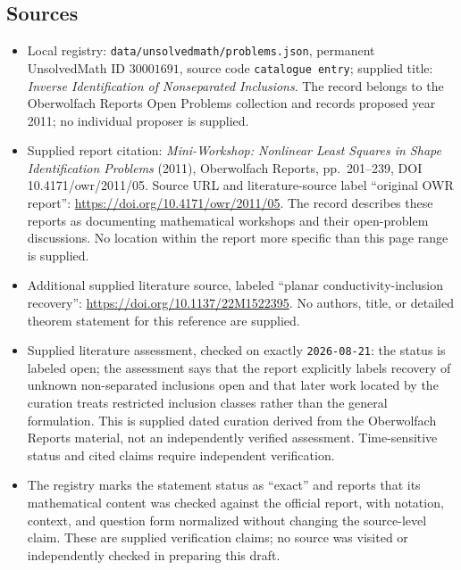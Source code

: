\documentclass[11pt]{article}
\begin{document}
\subsection{Sources}
\begin{itemize}
\item Local registry: \texttt{data/unsolvedmath/problems.json}, permanent UnsolvedMath ID \(30001691\), source code \texttt{catalogue entry}; supplied title: \emph{Inverse Identification of Nonseparated Inclusions}. The record belongs to the Oberwolfach Reports Open Problems collection and records proposed year 2011; no individual proposer is supplied.
\item Supplied report citation: \emph{Mini-Workshop: Nonlinear Least Squares in Shape Identification Problems} (2011), Oberwolfach Reports, pp.~201--239, DOI 10.4171/owr/2011/05. Source URL and literature-source label ``original OWR report'': \url{https://doi.org/10.4171/owr/2011/05}. The record describes these reports as documenting mathematical workshops and their open-problem discussions. No location within the report more specific than this page range is supplied.
\item Additional supplied literature source, labeled ``planar conductivity-inclusion recovery'': \url{https://doi.org/10.1137/22M1522395}. No authors, title, or detailed theorem statement for this reference are supplied.
\item Supplied literature assessment, checked on exactly \texttt{2026-08-21}: the status is labeled open; the assessment says that the report explicitly labels recovery of unknown non-separated inclusions open and that later work located by the curation treats restricted inclusion classes rather than the general formulation. This is supplied dated curation derived from the Oberwolfach Reports material, not an independently verified assessment. Time-sensitive status and cited claims require independent verification.
\item The registry marks the statement status as ``exact'' and reports that its mathematical content was checked against the official report, with notation, context, and question form normalized without changing the source-level claim. These are supplied verification claims; no source was visited or independently checked in preparing this draft.
\end{itemize}
\end{document}
